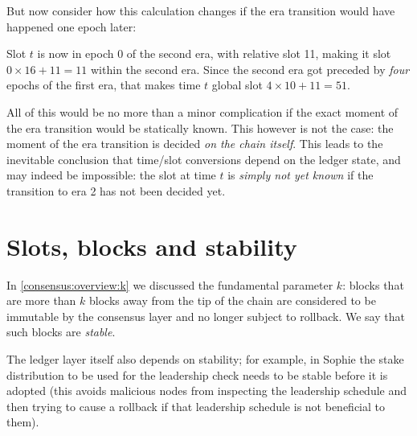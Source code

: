 But now consider how this calculation changes if the era transition would have
happened one epoch later:
%
\begin{center}
\end{center}
%
Slot $t$ is now in epoch 0 of the second era, with relative
slot 11, making it slot $0 \times 16 + 11 = 11$ within the second era.
Since the second era got preceded by \emph{four} epochs of the first era,
that makes time $t$ global slot $4 \times 10 + 11 = 51$.

All of this would be no more than a minor complication if the exact moment of
the era transition would be statically known. This however is not the case: the
moment of the era transition is decided \emph{on the chain itself}. This leads
to the inevitable conclusion that time/slot conversions depend on the ledger
state, and may indeed be impossible: the slot at time $t$ is \emph{simply not
yet known} if the transition to era 2 has not been decided yet.

\section{Slots, blocks and stability}
\label{time:slots-vs-blocks}

In \cref{consensus:overview:k} we discussed the fundamental parameter $k$:
blocks that are more than $k$ blocks away from the tip of the chain are
considered to be immutable by the consensus layer and no longer subject to
rollback. We say that such blocks are \emph{stable}.

The ledger layer itself also depends on stability; for example, in Sophie the
stake distribution to be used for the leadership check needs to be stable before
it is adopted (this avoids malicious nodes from inspecting the leadership
schedule and then trying to cause a rollback if that leadership schedule is not
beneficial to them).

